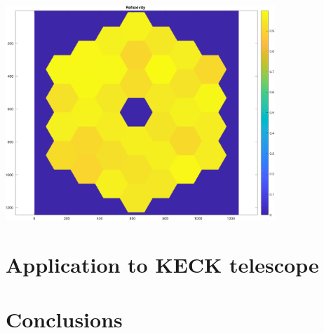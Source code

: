 \documentclass[12pt]{article}
\begin{document}
\includegraphics [width=4in]{docuPupilClass_17.pdf}

\section{Application to KECK telescope}

\section{Conclusions}


 

\end{document}
